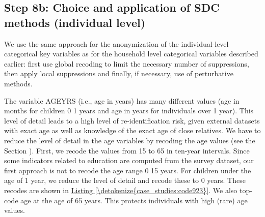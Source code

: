 \documentclass[letterpaper,10pt,english]{sphinxmanual}
\begin{document}
\subsection{Step 8b: Choice and application of SDC methods (individual level)}
\label{\detokenize{case_studies:step-8b-choice-and-application-of-sdc-methods-individual-level}}
We use the same approach for the anonymization of the individual-level
categorical key variables as for the household level categorical
variables described earlier: first use global recoding to limit the
necessary number of suppressions, then apply local suppressions and
finally, if necessary, use of perturbative methods.

The variable AGEYRS (i.e., age in years) has many different values (age
in months for children 0 \textendash{} 1 years and age in years for individuals over
1 year). This level of detail leads to a high level of re-identification
risk, given external datasets with exact age as well as knowledge of the
exact age of close relatives. We have to reduce the level of detail in
the age variables by recoding the age values (see the Section
 ). First, we recode the values from 15 to 65 in ten-year
intervals. Since some indicators related to education are computed from
the survey dataset, our first approach is not to recode the age range 0
\textendash{} 15 years. For children under the age of 1 year, we reduce the level of
detail and recode these to 0 years. These recodes are shown in \hyperref[\detokenize{case_studies:code923}]{Listing \ref{\detokenize{case_studies:code923}}}.
We also top-code age at the age of 65 years. This protects
individuals with high (rare) age values.
\end{document}
